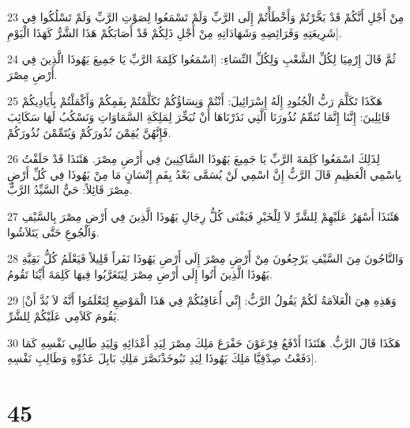 \par 23 مِنْ أَجْلِ أَنَّكُمْ قَدْ بَخَّرْتُمْ وَأَخْطَأْتُمْ إِلَى الرَّبِّ وَلَمْ تَسْمَعُوا لِصَوْتِ الرَّبِّ وَلَمْ تَسْلُكُوا فِي شَرِيعَتِهِ وَفَرَائِضِهِ وَشَهَادَاتِهِ مِنْ أَجْلِ ذَلِكُمْ قَدْ أَصَابَكُمْ هَذَا الشَّرُّ كَهَذَا الْيَوْمِ].
\par 24 ثُمَّ قَالَ إِرْمِيَا لِكُلِّ الشَّعْبِ وَلِكُلِّ النِّسَاءِ: [اسْمَعُوا كَلِمَةَ الرَّبِّ يَا جَمِيعَ يَهُوذَا الَّذِينَ فِي أَرْضِ مِصْرَ.
\par 25 هَكَذَا تَكَلَّمَ رَبُّ الْجُنُودِ إِلَهُ إِسْرَائِيلَ: أَنْتُمْ وَنِسَاؤُكُمْ تَكَلَّمْتُمْ بِفَمِكُمْ وَأَكْمَلْتُمْ بِأَيَادِيكُمْ قَائِلِينَ: إِنَّنَا إِنَّمَا نُتَمِّمُ نُذُورَنَا الَّتِي نَذَرْنَاهَا أَنْ نُبَخِّرَ لِمَلِكَةِ السَّمَاوَاتِ وَنَسْكُبُ لَهَا سَكَائِبَ فَإِنَّهُنَّ يُقِمْنَ نُذُورَكُمْ وَيُتَمِّمْنَ نُذُورَكُمْ.
\par 26 لِذَلِكَ اسْمَعُوا كَلِمَةَ الرَّبِّ يَا جَمِيعَ يَهُوذَا السَّاكِنِينَ فِي أَرْضِ مِصْرَ. هَئَنَذَا قَدْ حَلَفْتُ بِاسْمِي الْعَظِيمِ قَالَ الرَّبُّ إِنَّ اسْمِي لَنْ يُسَمَّى بَعْدُ بِفَمِ إِنْسَانٍ مَا مِنْ يَهُوذَا فِي كُلِّ أَرْضِ مِصْرَ قَائِلاً: حَيٌّ السَّيِّدُ الرَّبُّ.
\par 27 هَئَنَذَا أَسْهَرُ عَلَيْهِمْ لِلشَّرِّ لاَ لِلْخَيْرِ فَيَفْنَى كُلُّ رِجَالِ يَهُوذَا الَّذِينَ فِي أَرْضِ مِصْرَ بِالسَّيْفِ وَالْجُوعِ حَتَّى يَتَلاَشُوا.
\par 28 وَالنَّاجُونَ مِنَ السَّيْفِ يَرْجِعُونَ مِنْ أَرْضِ مِصْرَ إِلَى أَرْضِ يَهُوذَا نَفَراً قَلِيلاً فَيَعْلَمُ كُلُّ بَقِيَّةِ يَهُوذَا الَّذِينَ أَتُوا إِلَى أَرْضِ مِصْرَ لِيَتَغَرَّبُوا فِيهَا كَلِمَةَ أَيِّنَا تَقُومُ.
\par 29 [وَهَذِهِ هِيَ الْعَلاَمَةُ لَكُمْ يَقُولُ الرَّبُّ: إِنِّي أُعَاقِبُكُمْ فِي هَذَا الْمَوْضِعِ لِتَعْلَمُوا أَنَّهُ لاَ بُدَّ أَنْ يَقُومَ كَلاَمِي عَلَيْكُمْ لِلشَّرِّ.
\par 30 هَكَذَا قَالَ الرَّبُّ. هَئَنَذَا أَدْفَعُ فِرْعَوْنَ حَفْرَعَ مَلِكَ مِصْرَ لِيَدِ أَعْدَائِهِ وَلِيَدِ طَالِبِي نَفْسِهِ كَمَا دَفَعْتُ صِدْقِيَّا مَلِكَ يَهُوذَا لِيَدِ نَبُوخَذْنَصَّرَ مَلِكِ بَابِلَ عَدُوِّهِ وَطَالِبِ نَفْسِهِ].

\chapter{45}

